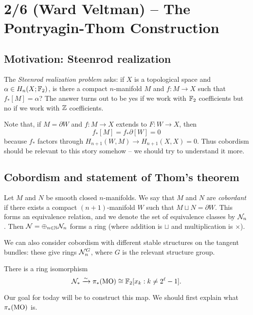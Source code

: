 \documentclass{article}
\begin{document}
\section{2/6 (Ward Veltman) -- The Pontryagin-Thom Construction}

\subsection{Motivation: Steenrod realization}

The \emph{Steenrod realization problem} asks: if $X$ is a topological space and $\alpha \in H_n(X; \mathbb{F}_2)$, is there a compact $n$-manifold $M$ and $f: M \to X$ such that $f_* [M] = \alpha$?
The answer turns out to be yes if we work with $\mathbb{F}_2$ coefficients but no if we work with $\mathbb{Z}$ coefficients.

Note that, if $M = \partial W$ and $f: M \to X$ extends to $F: W \to X$, then
\[
	f_* [M] = f_* \partial [W] = 0
\]
because $f_*$ factors through $H_{n+1}(W, M) \to H_{n+1}(X, X) = 0$.
Thus cobordism should be relevant to this story somehow -- we should try to understand it more.

\subsection{Cobordism and statement of Thom's theorem}

\begin{dfn}
	Let $M$ and $N$ be smooth closed $n$-manifolds.
	We say that $M$ and $N$ are \emph{cobordant} if there exists a compact $(n+1)$-manifold $W$ such that $M \sqcup N = \partial W$.
	This forms an equivalence relation, and we denote the set of equivalence classes by $\mathcal{N}_n$.
	Then $\mathcal{N} = \oplus_{n \in \mathbb{N}} \mathcal{N}_n$ forms a ring (where addition is $\sqcup$ and multiplication is $\times$).
\end{dfn}

We can also consider cobordism with different stable structures on the tangent bundles: these give rings $\mathcal{N}_n^G$, where $G$ is the relevant structure group.

\begin{thm}[Thom, 1954]
	There is a ring isomorphism 
	\[
		\mathcal{N}_* \xrightarrow{\sim} \pi_*(\mathrm{MO}) \cong \mathbb{F}_2[x_k : k \neq 2^\ell - 1].
	\]
\end{thm}

Our goal for today will be to construct this map.
We should first explain what $\pi_*(\mathrm{MO})$ is.
\end{document}
